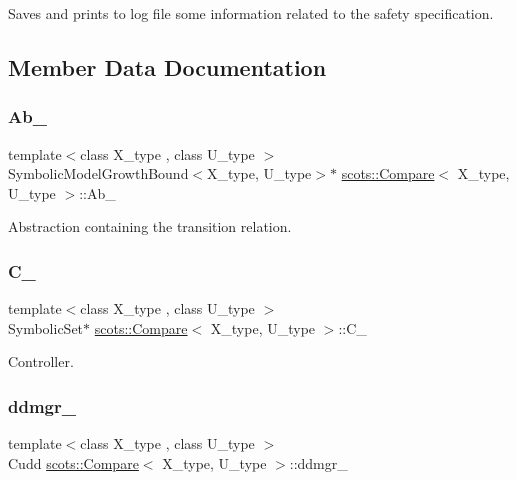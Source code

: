 Saves and prints to log file some information related to the safety specification. 

\subsection{Member Data Documentation}
\mbox{\label{classscots_1_1Compare_a0ec2c4c168dc46f79616a393c1cda103}} 
\subsubsection{\texorpdfstring{Ab\+\_\+}{Ab\_}}
{\footnotesize\ttfamily template$<$class X\+\_\+type , class U\+\_\+type $>$ \\
Symbolic\+Model\+Growth\+Bound$<$X\+\_\+type, U\+\_\+type$>$$\ast$ \hyperlink{classscots_1_1Compare}{scots\+::\+Compare}$<$ X\+\_\+type, U\+\_\+type $>$\+::Ab\+\_\+}

Abstraction containing the transition relation. \mbox{\label{classscots_1_1Compare_a1ffd2853abc9ab09cfb8983b3664ab1b}} 
\subsubsection{\texorpdfstring{C\+\_\+}{C\_}}
{\footnotesize\ttfamily template$<$class X\+\_\+type , class U\+\_\+type $>$ \\
Symbolic\+Set$\ast$ \hyperlink{classscots_1_1Compare}{scots\+::\+Compare}$<$ X\+\_\+type, U\+\_\+type $>$\+::C\+\_\+}

Controller. \mbox{\label{classscots_1_1Compare_a330d650aa232026ba22f43aa81974af9}} 
\subsubsection{\texorpdfstring{ddmgr\+\_\+}{ddmgr\_}}
{\footnotesize\ttfamily template$<$class X\+\_\+type , class U\+\_\+type $>$ \\
Cudd \hyperlink{classscots_1_1Compare}{scots\+::\+Compare}$<$ X\+\_\+type, U\+\_\+type $>$\+::ddmgr\+\_\+}

